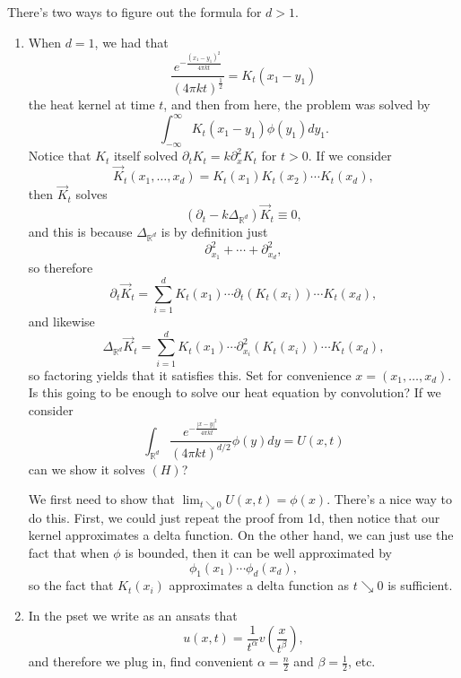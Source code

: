 \begin{remark}
	There's two ways to figure out the formula for \( d > 1 \). 
	\begin{enumerate}
	
		\item When \( d = 1 \), we had that
			\[ \frac{e^{-\frac{(x_{1} - y_{1})^{2}}{4 \pi k t}}}{\left( 4 \pi k t \right)^{\frac{1}{2}}} = K_{t}(x_{1} - y_{1}) \]
			the heat kernel at time \( t \), and then from here, the problem was solved by
			\[ \int_{- \infty}^{\infty} K_{t}(x_{1} - y_{1}) \phi(y_{1}) dy_{1}.  \]
			Notice that \( K_{t} \) itself solved \( \partial_{t} K_{t} = k \partial_{x}^{2} K_{t} \) for \( t > 0 \). If we consider 
			\[ \vec K_{t}(x_{1}, \ldots, x_{d}) = K_{t}(x_{1}) K_{t}(x_{2}) \cdots K_{t}(x_{d}), \]
			then \( \vec K_{t} \) solves
			\[ \left( \partial_{t} - k \Delta_{\mathbb{R}^{d}} \right) \vec K_{t} \equiv 0, \]
			and this is because \( \Delta_{\mathbb{R}^{d}} \) is by definition just
			\[ \partial_{x_{1}}^{2} + \cdots + \partial_{x_{d}}^{2}, \]
			so therefore
			\[ \partial_{t} \vec K_{t} = \sum_{i=1}^{d} K_{t}(x_{1}) \cdots \partial_{t}\left( K_{t}(x_{i}) \right) \cdots K_{t}(x_{d}), \]	
			and likewise
			\[ \Delta_{\mathbb{R}^{d}} \vec K_{t} = \sum_{i=1}^{d} K_{t}(x_{1}) \cdots \partial_{x_{i}}^{2} \left( K_{t}(x_{i}) \right) \cdots K_{t}(x_{d}), \]
			so factoring yields that it satisfies this. Set for convenience \( x = (x_{1}, \ldots, x_{d}) \).
			Is this going to be enough to solve our heat equation by convolution? If we consider
			\[ \int_{\mathbb{R}^{d}} \frac{e^{- \frac{|x - y|^{2}}{4 \pi k t}}}{(4 \pi k t)^{d/2}} \phi(y) dy = U(x, t) \]
			can we show it solves \( (H) \)? 

			We first need to show that \( \lim_{t \searrow 0}U(x, t) = \phi(x) \). There's a nice way to do this. First, we could just repeat the proof from 1d, then notice that our kernel approximates a delta function. On the other hand, we can just use the fact that when \( \phi \) is bounded, then it can be well approximated by
			\[ \phi_{1}(x_{1}) \cdots \phi_{d}(x_{d}), \]
			so the fact that \( K_{t}(x_{i}) \) approximates a delta function as \( t \searrow 0 \) is sufficient.

		\item In the pset we write as an ansats that
			\[ u(x, t) = \frac{1}{t^{\alpha}} v \left( \frac{x}{t^{\beta}} \right), \]
			and therefore we plug in, find convenient \( \alpha = \frac{n}{2} \) and \( \beta = \frac{1}{2} \), etc.
	\end{enumerate}
\end{remark}

